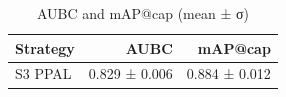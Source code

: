 \begin{table}[t]
\centering
\caption{AUBC and mAP@cap (mean ± σ)}
\label{tbl:aubc}
\begin{tabular}{lrr}
\toprule
Strategy & AUBC & mAP@cap \\
\midrule
S3 PPAL & 0.829 ± 0.006 & 0.884 ± 0.012 \\
\bottomrule
\end{tabular}
\end{table}
